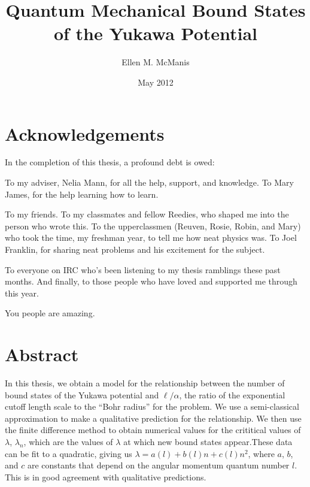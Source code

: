 \documentclass[12pt,twoside]{reedthesis}
\title{Quantum Mechanical Bound States of the Yukawa Potential}
\author{Ellen M. McManis}
\date{May 2012}
\begin{document}
  \maketitle
  \frontmatter %
  \pagestyle{empty} %

    \chapter*{Acknowledgements}
In the completion of this thesis, a profound debt is owed:

To my adviser, Nelia Mann, for all the help, support, and knowledge. To Mary James, for the help learning how to learn.

To my friends. To my classmates and fellow Reedies, who shaped me into the person who wrote this. To the upperclassmen (Reuven, Rosie, Robin, and Mary) who took the time, my freshman year, to tell me how neat physics was. To Joel Franklin, for sharing neat problems and his excitement for the subject. 

To everyone on IRC who's been listening to my thesis ramblings these past months. And finally, to those people who have loved and supported me through this year.

You people are amazing.

    \tableofcontents
    \listoftables
    \listoffigures

    \chapter*{Abstract}
In this thesis, we obtain a model for the relationship between the number of bound states of the Yukawa potential and $\ell/\alpha$, the ratio of the exponential cutoff length scale to the ``Bohr radius'' for the problem. We use a semi-classical approximation to make a qualitative prediction for the relationship. We then use the finite difference method to obtain numerical values for the crititical values of $\lambda$, $\lambda_n$, which are the values of $\lambda$ at which new bound states appear.These data can be fit to a quadratic, giving us $\lambda = a(l) + b(l)n + c(l)n^2$, where $a$, $b$, and $c$ are constants that depend on the angular momentum quantum number $l$. This is in good agreement with qualitative predictions.
\end{document}
